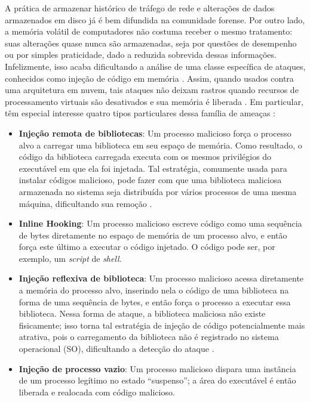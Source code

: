 A prática de armazenar histórico de tráfego de rede e alterações de dados armazenados em disco já é bem difundida na comunidade forense.
%
Por outro lado, a memória volátil de computadores não costuma receber o mesmo tratamento: suas alterações quase nunca são armazenadas, seja por questões de desempenho ou por simples praticidade, dado a reduzida sobrevida dessas informações.
%
Infelizmente, isso acaba dificultando a análise de uma classe específica de ataques, conhecidos como injeção de código em memória \cite{CaseMemoryForensics:2014}. 
%
Assim, quando usados contra uma arquitetura em nuvem, tais ataques não deixam rastros quando recursos de processamento virtuais são desativados e sua memória é liberada \cite{VomelMemoryAcquisition:2013,CaseMemoryForensics:2014}.
%
Em particular, têm especial interesse quatro tipos particulares dessa família de ameaças \cite{CaseMemoryForensics:2014}:


\begin{itemize}
 \item \textbf{Injeção remota de bibliotecas}: Um processo malicioso força o processo alvo a carregar uma biblioteca em seu espaço de memória.
 Como resultado, o código da biblioteca carregada executa com os mesmos privilégios do executável em que ela foi injetada. 
 Tal estratégia, comumente usada para instalar códigos malicioso, pode fazer com que uma biblioteca maliciosa armazenada no sistema seja distribuída por vários processos de uma mesma máquina, dificultando sua remoção \cite{MillerRemoteLibraryInjection:2004}.
 
 \item \textbf{Inline Hooking}: Um processo malicioso escreve código como uma sequência de bytes diretamente no espaço de memória de um processo alvo, e então força este último a executar o código injetado. 
 O código pode ser, por exemplo, um \textit{script} de \textit{shell}.
 

 \item \textbf{Injeção reflexiva de biblioteca}: Um processo malicioso acessa diretamente a memória do processo alvo, inserindo nela o código de uma biblioteca na forma de uma sequência de bytes, e então força o processo a executar essa biblioteca. 
 Nessa forma de ataque, a biblioteca maliciosa não existe fisicamente; isso torna tal estratégia de injeção de código potencialmente mais atrativa, pois o carregamento da biblioteca não é registrado no sistema operacional (SO), dificultando a detecção do ataque \cite{FewerReflectiveLibraryInject:2008}.
 
 \item \textbf{Injeção de processo vazio}: Um processo malicioso dispara uma instância de um processo legítimo no estado ``suspenso''; a área do executável é então liberada e realocada com código malicioso.
\end{itemize}


